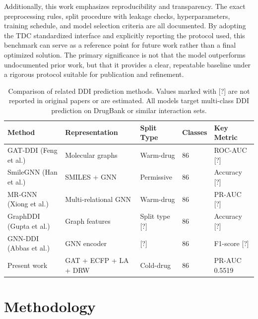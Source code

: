 \documentclass[11pt,a4paper]{report}
\begin{document}
Additionally, this work emphasizes reproducibility and transparency. The exact preprocessing rules, split procedure with leakage checks, hyperparameters, training schedule, and model selection criteria are all documented. By adopting the TDC standardized interface and explicitly reporting the protocol used, this benchmark can serve as a reference point for future work rather than a final optimized solution. The primary significance is not that the model outperforms undocumented prior work, but that it provides a clear, repeatable baseline under a rigorous protocol suitable for publication and refinement.

\begin{table}[H]
\centering
\caption{Comparison of related DDI prediction methods. Values marked with [?] are not reported in original papers or are estimated. All models target multi-class DDI prediction on DrugBank or similar interaction sets.}
\label{tab:lit_comparison}
\begin{tabular}{lllll}
\toprule
Method & Representation & Split Type & Classes & Key Metric \\
\midrule
GAT-DDI (Feng et al.)         & Molecular graphs         & Warm-drug      & 86 & ROC-AUC [?] \\
SmileGNN (Han et al.)         & SMILES + GNN            & Permissive     & 86 & Accuracy [?] \\
MR-GNN (Xiong et al.)         & Multi-relational GNN    & Warm-drug      & 86 & PR-AUC [?] \\
GraphDDI (Gupta et al.)       & Graph features          & Split type [?] & 86 & Accuracy [?] \\
GNN-DDI (Abbas et al.)        & GNN encoder             & [?]            & 86 & F1-score [?] \\
Present work                  & GAT + ECFP + LA + DRW   & Cold-drug      & 86 & PR-AUC 0.5519 \\
\bottomrule
\end{tabular}
\end{table}

\chapter{Methodology}
\end{document}
